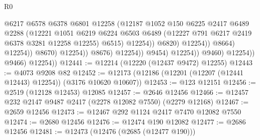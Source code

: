 \begin{lexlean}{R0}
\begin{coremodule}
                                                @6217
                                                @6578
                                                @6378
                                                @6801
                                                @12258
                                                (@12187
                                                  @1052
                                                  @150
                                                  @6225
                                                  @2417
                                                  @6489
                                                  @2288
                                                  (@12221
                                                    @1051
                                                    @6219
                                                    @6224
                                                    @6503
                                                    @6489
                                                    (@12227
                                                      @791
                                                      @6217
                                                      @2419
                                                      @6378
                                                      @3281
                                                      @12258
                                                      @12255)
                                                    @6515)
                                                  @12254))
                                              @6820)
                                            @12254))
                                        @8664)
                                      @12254))
                                  @8670)
                                @12254))
                            @8676)
                          @12254))
                      @9454)
                    @12254))
                @9460)
              @12254))
          @9466)
        @12254))
@12441 := @12214 (@12220 (@12437 @9472) @12255)
@12443 := @4073 @9208 @82
@12452 := @12173 (@12186 (@12201 (@12207 (@12441 @12443) @12254)) (@3176 @10620 @10607))
@12453 := @123 @12151
@12456 := @2519 (@12128 @12453) @12085
@12457 := @2646 @12456
@12466 := @12457 @232 @2147 @9487 @2417 (@2278 @12082 @7550) (@2279 @12168)
@12467 := @2659 @12456
@12473 := @12467 @292 @1124 @2417 @7470 @12082 @7550
@12474 := @2680 @12456
@12476 := @12474 @190 @12082
@12477 := @2686 @12456
@12481 := @12473 (@12476 (@2685 (@12477 @190)))

\end{coremodule}
\end{lexlean}
